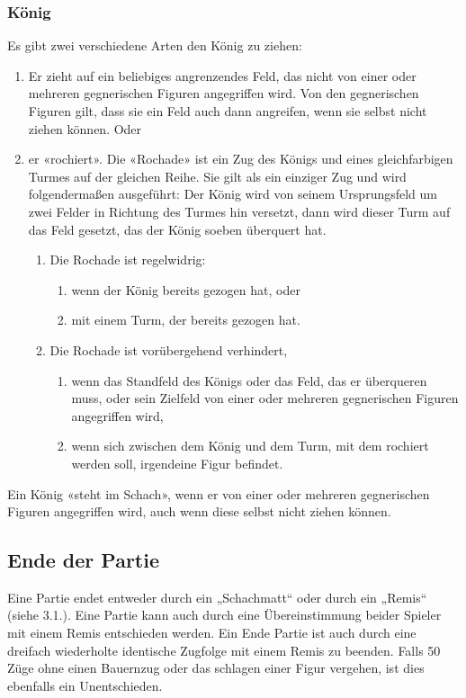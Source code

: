 \documentclass[a4paper, 10pt]{scrartcl}
\begin{document}
\subsubsection{König}
Es gibt zwei verschiedene Arten den König zu ziehen:
\begin{enumerate}
        \item Er zieht auf ein beliebiges angrenzendes Feld, das nicht von einer oder mehreren gegnerischen Figuren angegriffen wird. Von den gegnerischen Figuren gilt, dass sie ein Feld auch dann angreifen, wenn sie selbst nicht ziehen können. Oder
        \item er «rochiert». Die «Rochade» ist ein Zug des Königs und eines gleichfarbigen Turmes auf der gleichen Reihe. Sie gilt als ein einziger Zug und wird folgendermaßen ausgeführt: Der König wird von seinem Ursprungsfeld um zwei Felder in Richtung des Turmes hin versetzt, dann wird dieser Turm auf das Feld gesetzt, das der König soeben überquert hat.
        \begin{enumerate}
                \item Die Rochade ist regelwidrig:
                \begin{enumerate}
                        \item wenn der König bereits gezogen hat, oder
                        \item mit einem Turm, der bereits gezogen hat.
                \end{enumerate}
                \item Die Rochade ist vorübergehend verhindert,
                \begin{enumerate}
                        \item wenn das Standfeld des Königs oder das Feld, das er überqueren muss, oder sein Zielfeld von einer oder mehreren gegnerischen Figuren angegriffen wird,
                        \item wenn sich zwischen dem König und dem Turm, mit dem rochiert werden soll, irgendeine Figur befindet.
                \end{enumerate}
        \end{enumerate}
\end{enumerate}
Ein König «steht im Schach», wenn er von einer oder mehreren gegnerischen Figuren angegriffen wird, auch wenn diese selbst nicht ziehen können.

\subsection{Ende der Partie}
Eine Partie endet entweder durch ein „Schachmatt“ oder durch ein „Remis“ (siehe 3.1.).
Eine Partie kann auch durch eine Übereinstimmung beider Spieler mit einem Remis entschieden werden. 
Ein Ende Partie ist auch durch eine dreifach wiederholte identische Zugfolge mit einem Remis zu beenden. 
Falls 50 Züge ohne einen Bauernzug oder das schlagen einer Figur vergehen, ist dies ebenfalls ein Unentschieden.
\end{document}
